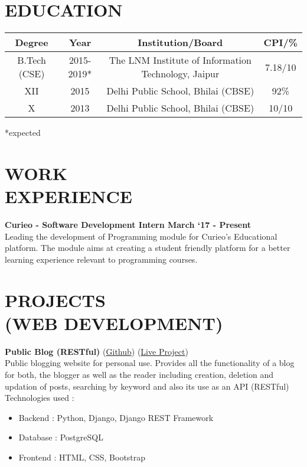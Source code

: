 \documentclass[margin]{res}
\begin{document}
\begin{resume}

\section{EDUCATION}

\begin{tabular}{|c|c|c|c|}

\hline
\textbf{Degree} & \textbf{Year} & {Institution/Board} & {CPI/\%} \\
\hline
B.Tech (CSE) & 2015-2019* & The LNM Institute of Information Technology, Jaipur & 7.18/10 \\
\hline
XII & 2015 & Delhi Public School, Bhilai (CBSE) & 92\% \\
\hline
X & 2013 & Delhi Public School, Bhilai (CBSE) & 10/10 \\
\hline
\end{tabular}
*expected

\section{WORK\\EXPERIENCE} {\textbf{Curieo - Software Development Intern \hfill March `17 - Present\\}}
Leading the development of Programming module for Curieo's Educational platform. The module aims at creating a student friendly platform for a better learning experience relevant to programming courses.\\

\section{PROJECTS\\(WEB DEVELOPMENT)}
  {\textbf{Public Blog (RESTful)}} (\href{https://github.com/gauravkulkarni96/blog}{Github}) (\href{https://gauravkulkarni.herokuapp.com/blog}{Live Project})\\
  Public blogging website for personal use. Provides all the functionality of a blog for both, the blogger as well as the reader including creation, deletion and updation of posts, searching by keyword and also its use as an API (RESTful)\\
Technologies used :
   \begin{itemize}  \itemsep -2pt %
   \item Backend : Python, Django, Django REST Framework
   \item Database : PostgreSQL
   \item Frontend : HTML, CSS, Bootstrap
   \end{itemize}


\end{resume}
\end{document}
